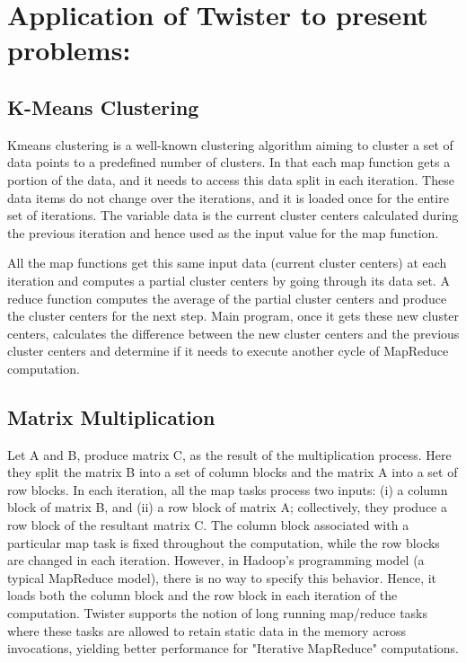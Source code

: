 \documentclass[9pt,twocolumn,twoside]{../../styles/osajnl}
\begin{document}
\section{Application of Twister to present problems:}

\subsection{K-Means Clustering}
Kmeans clustering is a well-known clustering algorithm aiming to
cluster a set of data points to a predefined number of clusters. In
that each map function gets a portion of the data, and it needs to
access this data split in each iteration. These data items do not
change over the iterations, and it is loaded once for the entire set
of iterations. The variable data is the current cluster centers
calculated during the previous iteration and hence used as the input
value for the map function\cite{twister}\cite{dean2008mapreduce}.

All the map functions get this same input data (current cluster
centers) at each iteration and computes a partial cluster centers by
going through its data set. A reduce function computes the average of
the partial cluster centers and produce the cluster centers for the
next step. Main program, once it gets these new cluster centers,
calculates the difference between the new cluster centers and the
previous cluster centers and determine if it needs to execute another
cycle of MapReduce
computation\cite{ekanayake2008mapreduce}\cite{twister}.


\subsection{Matrix Multiplication}
Let A and B, produce matrix C, as the result of the multiplication
process. Here they split the matrix B into a set of column blocks and
the matrix A into a set of row blocks. In each iteration, all the map
tasks process two inputs: (i) a column block of matrix B, and (ii) a
row block of matrix A; collectively, they produce a row block of the
resultant matrix C. The column block associated with a particular map
task is fixed throughout the computation, while the row blocks are
changed in each iteration. However, in Hadoop's programming model (a
typical MapReduce model), there is no way to specify this behavior.
Hence, it loads both the column block and the row block in each
iteration of the computation. Twister supports the notion of long
running map/reduce tasks where these tasks are allowed to retain
static data in the memory across invocations, yielding better
performance for "Iterative MapReduce"
computations\cite{dean2008mapreduce}\cite{twister}.
\end{document}

